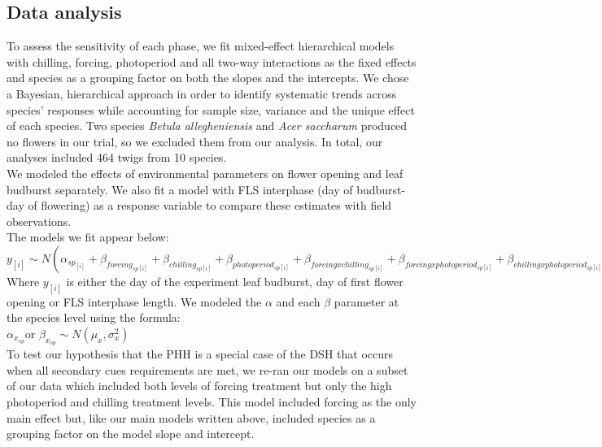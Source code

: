 \documentclass[11pt]{article}\usepackage[]{graphicx}\usepackage[]{color}
\begin{document}
\subsection*{Data analysis}
\noindent To assess the sensitivity of each phase, we fit mixed-effect hierarchical models with chilling, forcing, photoperiod and all two-way interactions as the fixed effects and species as a grouping factor on both the slopes and the intercepts. We chose a Bayesian, hierarchical approach in order to identify systematic trends across species' responses while accounting for sample size, variance and the unique effect of each species. Two species \textit{Betula allegheniensis} and \textit{Acer saccharum} produced no flowers in our trial, so we excluded them from our analysis. In total, our analyses included 464 twigs from 10 species. \\

\noident We modeled the effects of environmental parameters on flower opening and leaf budburst separately. We also fit a model with FLS interphase (day of budburst- day of flowering) as a response variable to compare these estimates with field observations.\\

The models we fit appear below:\\

$y_{[i]} \sim N(\alpha_{sp_{[i]}}+\beta_{forcing_{sp[i]}}+\beta_{chilling_{sp[i]}}+\beta_{photoperiod_{sp[i]}}+\beta_{forcing x chilling_{sp[i]}}+\beta_{forcing x photoperiod_{sp[i]}}+\beta_{chilling x photoperiod_{sp[i]}})$\\

Where $y_{[i]}$ is either the day of the experiment leaf budburst, day of first flower opening or FLS interphase length.  We modeled the $\alpha$ and each $\beta$ parameter at the species level using the formula:\\

$\alpha_{x_{sp}} $or $\beta_{x_{sp}} \sim N(\mu_x,\sigma^2_x)$\\


\noindent To test our hypothesis that the PHH is a special case of the DSH that occurs when all secondary cues requirements are met, we re-ran our models on a subset of our data which included both levels of forcing treatment but only the high photoperiod and chilling treatment levels. This model included forcing as the only main effect but, like our main models written above, included species as a grouping factor on the model slope and intercept.\\ 
\end{document}
